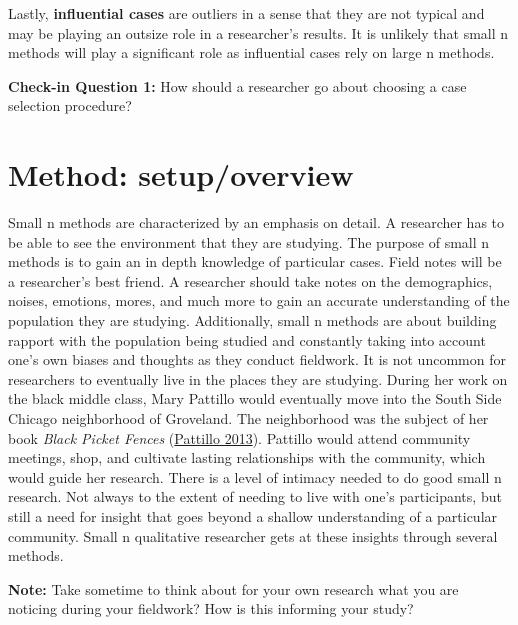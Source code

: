 \documentclass{book}
\newenvironment{shaded*}{
    \begin{center}
    \begin{tabular}{|p{0.9\textwidth}|}
    \hline\\
    }
    { 
    \\\\\hline
    \end{tabular} 
    \end{center}
}
\begin{document}
Lastly, \textbf{influential cases} are outliers in a sense that they are not
typical and may be playing an outsize role in a researcher's results. It is
unlikely that small n methods will play a significant role as influential
cases rely on large n methods.

\begin{shaded*}

\textbf{Check-in Question 1:} How should a researcher go about choosing a case
selection procedure?

\end{shaded*}

\hypertarget{method-setupoverview-2}{%
\section{Method: setup/overview}\label{method-setupoverview-2}}

Small n methods are characterized by an emphasis on detail. A researcher has
to be able to see the environment that they are studying. The purpose of small
n methods is to gain an in depth knowledge of particular cases. Field notes
will be a researcher's best friend. A researcher should take notes on the
demographics, noises, emotions, mores, and much more to gain an accurate
understanding of the population they are studying. Additionally, small n
methods are about building rapport with the population being studied and
constantly taking into account one's own biases and thoughts as they conduct
fieldwork. It is not uncommon for researchers to eventually live in the places
they are studying. During her work on the black middle class, Mary Pattillo
would eventually move into the South Side Chicago neighborhood of Groveland.
The neighborhood was the subject of her book \emph{Black Picket Fences}
(\protect\hyperlink{ref-pattillo2013a}{Pattillo 2013}). Pattillo would attend
community meetings, shop, and cultivate lasting relationships with the
community, which would guide her research. There is a level of intimacy needed
to do good small n research. Not always to the extent of needing to live with
one's participants, but still a need for insight that goes beyond a shallow
understanding of a particular community. Small n qualitative researcher gets
at these insights through several methods.

\begin{shaded*}

\textbf{Note:} Take sometime to think about for your own research what you are
noticing during your fieldwork? How is this informing your study?

\end{shaded*}
\end{document}
